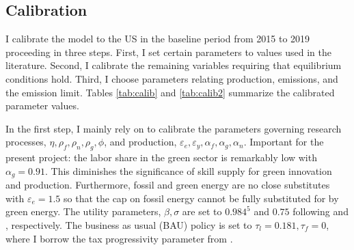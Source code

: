 \subsection{Calibration}\label{subsec:calib}
I calibrate the model to the US in the baseline period from 2015 to 2019 proceeding in three steps. First, I set certain parameters to values used in the literature. Second, I calibrate the remaining variables requiring that equilibrium conditions hold. Third, I choose parameters relating production, emissions, and the emission limit. Tables \ref{tab:calib} and \ref{tab:calib2} summarize the calibrated parameter values.

In the first step, I mainly rely on \cite{Fried2018ClimateAnalysis} to calibrate the parameters governing research processes, $\eta, \rho_f,\rho_n, \rho_g, \phi $, and production, $\varepsilon_e, \varepsilon_y, \alpha_f, \alpha_g, \alpha_n$.  Important for the present project: the labor share in the green sector is remarkably low with $\alpha_g=0.91$. This diminishes the significance of skill supply for green innovation and production. Furthermore, fossil and green energy are no close substitutes with $\varepsilon_e=1.5$ so that the cap on fossil energy cannot be fully substituted for by green energy. The utility parameters, $\beta, \sigma$ are set to $0.984^5$ and $0.75$ following \cite{Barrage2019OptimalPolicy} and \cite{Chetty2011AreMargins}, respectively. The business as usual (BAU) policy is set to $\tau_l=0.181, \tau_f=0$, where I borrow the tax progressivity parameter from \cite{Heathcote2017OptimalFramework}. 


